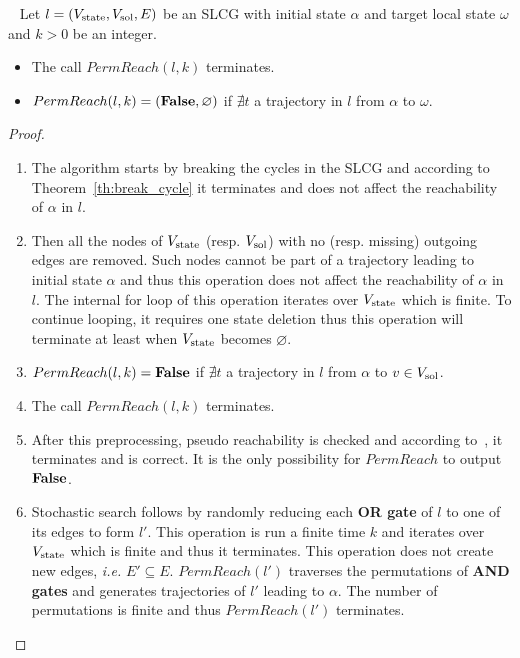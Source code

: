 \begin{theorem}\label{th:PermReachCorrectness} ~
    Let $l=(V_{\mathrm{state}}, V_{\mathrm{sol}}, E)$ be an SLCG with initial state $\alpha$ and target local state $\omega$ and $k > 0$ be an integer.
    \begin{itemize}
        \item The call $PermReach(l,k)$ terminates.
        \item $PermReach(l,k)=(\mathbf{False},\varnothing)$ if $\nexists t$ a trajectory in $l$ from $\alpha$ to $\omega$.
    \end{itemize}
    
    \begin{proof}
        \begin{enumerate}
            \item The algorithm starts by breaking the cycles in the SLCG and according to Theorem~\ref{th:break_cycle} it terminates and does not affect the reachability of $\alpha$ in $l$.
            \item Then all the nodes of $V_{\mathrm{state}}$ (resp. $V_{\mathrm{sol}}$) with no (resp. missing) outgoing edges are removed.
            Such nodes cannot be part of a trajectory leading to initial state $\alpha$ and thus this operation does not affect the reachability of $\alpha$ in $l$.
            The internal for loop of this operation iterates over $V_{\mathrm{state}}$ which is finite.
            To continue looping, it requires one state deletion thus this operation will terminate at least when $V_{\mathrm{state}}$ becomes $\varnothing$.
            \item $PermReach(l,k)=\mathbf{False}$ if $\nexists t$ a trajectory in $l$ from $\alpha$ to $v \in V_{\mathrm{sol}}$.
            \item The call $PermReach(l,k)$ terminates.
            \item After this preprocessing, pseudo reachability is checked and according to~\cite{pauleve2012}, it terminates and is correct.
            It is the only possibility for $PermReach$ to output $\mathbf{False}$.
            \item Stochastic search follows by randomly reducing each \textbf{OR gate} of $l$ to one of its edges to form $l'$.
            This operation is run a finite time $k$ and iterates over $V_{\mathrm{state}}$ which is finite and thus it terminates.
            This operation does not create new edges, \textit{i.e.} $E' \subseteq E$.
            $PermReach(l')$ traverses the permutations of \textbf{AND gates} and generates trajectories of $l'$ leading to $\alpha$.
            The number of permutations is finite and thus $PermReach(l')$ terminates.
        \end{enumerate}
    \end{proof}
\end{theorem}

